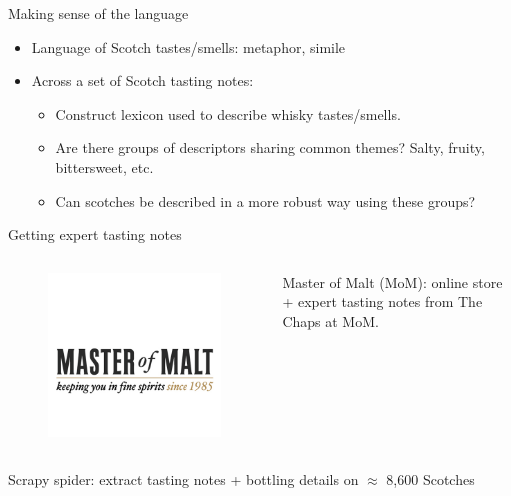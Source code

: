 \documentclass{beamer}
\begin{document}
\begin{frame}{Making sense of the language}
	\begin{itemize}
		\item Language of Scotch tastes/smells: metaphor, simile
		\item Across a set of Scotch tasting notes:
		\begin{itemize}
			\item Construct lexicon used to describe whisky tastes/smells.
			\item Are there groups of descriptors sharing common themes? Salty, fruity, bittersweet, etc.
			\item Can scotches be described in a more robust way using these groups?
		\end{itemize}
	\end{itemize}
\end{frame}





	\begin{frame}{Getting expert tasting notes}


	\begin{columns}
		\begin{column}{0.4\textwidth}
		\begin{figure}
			
			\includegraphics[scale = 0.2]{masterofmalt}
			
		\end{figure}
		\end{column}
		\begin{column}{0.6\textwidth}

		Master of Malt (MoM): online store + expert tasting notes from The Chaps at MoM.


		\end{column}
		
	\end{columns}
	Scrapy spider: extract tasting notes + bottling details on $\approx$ 8,600 Scotches
\end{frame}
\end{document}
